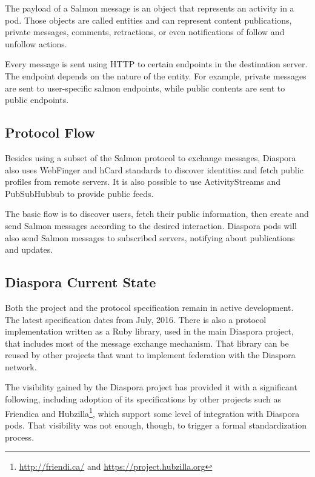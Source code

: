 The payload of a Salmon message is an object that represents an
activity in a pod. Those objects are called entities and can represent
content publications, private messages, comments, retractions, or even
notifications of follow and unfollow actions.

Every message is sent using HTTP to certain endpoints in the destination
server.  The endpoint depends on the nature of the entity. For example,
private messages are sent to user-specific salmon endpoints, while
public contents are sent to public endpoints.

\subsection{Protocol Flow}

Besides using a subset of the Salmon protocol to exchange messages,
Diaspora also uses WebFinger and hCard standards to discover identities
and fetch public profiles from remote servers. It is also possible to
use ActivityStreams and PubSubHubbub to provide public feeds.

The basic flow is to discover users, fetch their public information,
then create and send Salmon messages according to the desired
interaction. Diaspora pods will also send Salmon messages to subscribed
servers, notifying about publications and updates.

\subsection{Diaspora Current State}

Both the project and the protocol specification remain in active
development. The latest specification dates from July, 2016. There is
also a protocol implementation written as a Ruby library, used in the
main Diaspora project, that includes most of the message exchange
mechanism. That library can be reused by other projects that want to
implement federation with the Diaspora network.

The visibility gained by the Diaspora project has provided it with a
significant following, including adoption of its specifications by other
projects such as Friendica and Hubzilla\footnote{\url{http://friendi.ca/} and
\url{https://project.hubzilla.org}}, which support some level of
integration with Diaspora pods. That visibility was not enough, though,
to trigger a formal standardization process.
